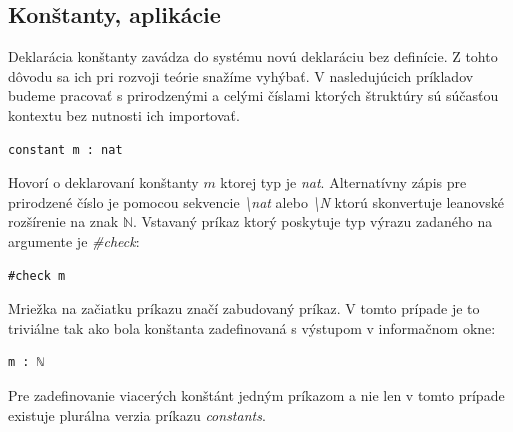 \documentclass[a4paper,10pt,oneside]{report}%
\begin{document}
\subsection{Konštanty, aplikácie}
    Deklarácia konštanty zavádza do systému novú deklaráciu bez definície.
    Z tohto dôvodu sa ich pri rozvoji teórie snažíme vyhýbať.
    V nasledujúcich príkladov budeme pracovať s prirodzenými a celými číslami
ktorých štruktúry sú súčasťou kontextu bez nutnosti ich importovať.
\begin{lstlisting}
constant m : nat
\end{lstlisting}
    Hovorí o deklarovaní konštanty $m$ ktorej typ je \emph{nat}.
    Alternatívny zápis pre prirodzené číslo je pomocou sekvencie \emph{\textbackslash nat}
alebo \emph{\textbackslash N} ktorú skonvertuje leanovské rozšírenie na znak $\mathbb{N}$.
    Vstavaný príkaz ktorý poskytuje typ výrazu zadaného na argumente je \emph{\#check}:
\begin{lstlisting}
#check m
\end{lstlisting}
    Mriežka na začiatku príkazu značí zabudovaný príkaz.
    V tomto prípade je to triviálne tak ako bola konštanta zadefinovaná s výstupom
v informačnom okne:
\begin{lstlisting}
m : ℕ
\end{lstlisting}
    Pre zadefinovanie viacerých konštánt jedným príkazom a nie len v tomto prípade
existuje plurálna verzia príkazu \emph{constants}.
\end{document}
